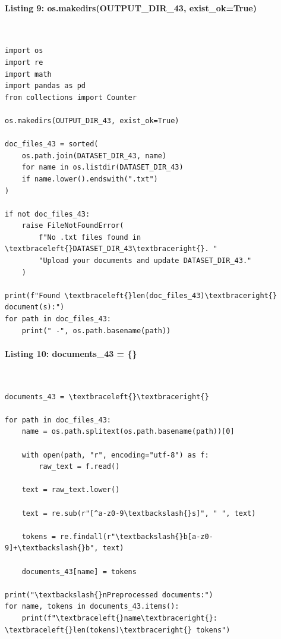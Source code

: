 \documentclass[12pt,a4paper,oneside]{report}
\begin{document}
\paragraph{Listing 9: os.makedirs(OUTPUT\_DIR\_43, exist\_ok=True)}\mbox{}\\[-1ex]
\begin{Verbatim}[commandchars=\\\{\},breaklines=true,breakanywhere=true,fontsize=\scriptsize,frame=leftline,framesep=2mm,rulecolor=\color{gray}]
import os
import re
import math
import pandas as pd
from collections import Counter

os.makedirs(OUTPUT_DIR_43, exist_ok=True)

doc_files_43 = sorted(
    os.path.join(DATASET_DIR_43, name)
    for name in os.listdir(DATASET_DIR_43)
    if name.lower().endswith(".txt")
)

if not doc_files_43:
    raise FileNotFoundError(
        f"No .txt files found in \textbraceleft{}DATASET_DIR_43\textbraceright{}. "
        "Upload your documents and update DATASET_DIR_43."
    )

print(f"Found \textbraceleft{}len(doc_files_43)\textbraceright{} document(s):")
for path in doc_files_43:
    print(" -", os.path.basename(path))
\end{Verbatim}
\paragraph{Listing 10: documents\_43 = \{\}}\mbox{}\\[-1ex]
\begin{Verbatim}[commandchars=\\\{\},breaklines=true,breakanywhere=true,fontsize=\scriptsize,frame=leftline,framesep=2mm,rulecolor=\color{gray}]
documents_43 = \textbraceleft{}\textbraceright{}

for path in doc_files_43:
    name = os.path.splitext(os.path.basename(path))[0]

    with open(path, "r", encoding="utf-8") as f:
        raw_text = f.read()

    text = raw_text.lower()

    text = re.sub(r"[^a-z0-9\textbackslash{}s]", " ", text)

    tokens = re.findall(r"\textbackslash{}b[a-z0-9]+\textbackslash{}b", text)

    documents_43[name] = tokens

print("\textbackslash{}nPreprocessed documents:")
for name, tokens in documents_43.items():
    print(f"\textbraceleft{}name\textbraceright{}: \textbraceleft{}len(tokens)\textbraceright{} tokens")
\end{Verbatim}
\end{document}

